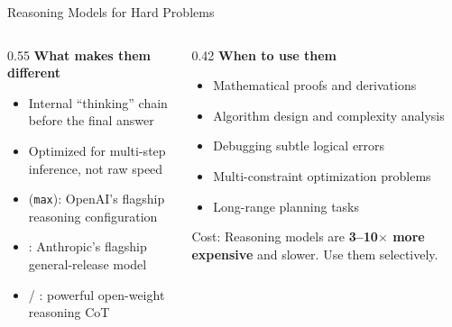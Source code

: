 \begin{frame}{Reasoning Models for Hard Problems}
  \begin{columns}[T, onlytextwidth]
    \begin{column}{0.55\textwidth}
      \textbf{What makes them different}\\[0.3em]
      \begin{itemize}
        \item Internal ``thinking'' chain before the final answer
        \item Optimized for multi-step inference, not raw speed
        \item {} (\texttt{max}): OpenAI's flagship reasoning configuration
        \item {}: Anthropic's flagship general-release model
        \item {} / : powerful open-weight reasoning CoT
      \end{itemize}
    \end{column}
    \hfill
    \begin{column}{0.42\textwidth}
      \textbf{When to use them}\\[0.3em]
      \begin{itemize}
        \item Mathematical proofs and derivations
        \item Algorithm design and complexity analysis
        \item Debugging subtle logical errors
        \item Multi-constraint optimization problems
        \item Long-range planning tasks
      \end{itemize}
      \vspace{0.5em}
      \alert{Cost:} Reasoning models are \textbf{3--10$\times$ more expensive} and slower. Use them selectively.
    \end{column}
  \end{columns}
\end{frame}

